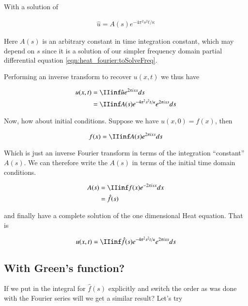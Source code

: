 With a solution of

\begin{align*}
\hat{u} = A(s) e^{ -4 \pi^2 s^2 t/ \kappa }
\end{align*}

Here $A(s)$ is an arbitrary constant in time integration constant, which may depend on $s$ since it is a solution of our simpler frequency domain partial differential equation
\ref{eqn:heat_fourier:toSolveFreq}.

Performing an inverse transform to recover $u(x,t)$ we thus have

\begin{align*}
u(x,t) 
&= 
\IIinf \hat{u} e^{2 \pi i x s } ds  \\
&= 
\IIinf A(s) e^{ -4 \pi^2 s^2 t/ \kappa } e^{2 \pi i x s } ds  \\
\end{align*}

Now, how about initial conditions.  Suppose we have $u(x,0) = f(x)$, then 

\begin{align*}
f(x) &= 
\IIinf A(s) e^{2 \pi i x s } ds \\
\end{align*}

Which is just an inverse Fourier transform in terms of the integration ``constant'' $A(s)$.  We can therefore write the $A(s)$ in terms of the
initial time domain conditions.

\begin{align*}
A(s) &= 
\IIinf f(x) e^{-2 \pi i s x } dx \\
&= \hat{f}(s)
\end{align*}

and finally have a complete solution of the one dimensional Heat equation.  That is

\begin{align*}
u(x,t) &= 
\IIinf \hat{f}(s) e^{ -4 \pi^2 s^2 t/ \kappa } e^{2 \pi i x s } ds  \\
\end{align*}

\subsection{With Green's function? }

If we put in the integral for $\hat{f}(s)$ explicitly and switch the order as was done with the Fourier series will we get a similar result?   Let's try

